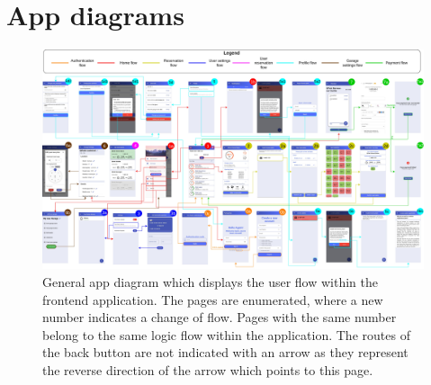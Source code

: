 \section{App diagrams}\label{app:app-diagram}
\begin{landscape}
   \begin{figure}
    \centering
    \includegraphics[width=25cm]{images/app/app_diagrams/app_diagram-general.jpg}
    \caption[General app diagram.]{General app diagram which displays the user flow within the frontend application. The pages are enumerated, where a new number indicates a change of flow. Pages with the same number belong to the same logic flow within the application. The routes of the back button are not indicated with an arrow as they represent the reverse direction of the arrow which points to this page.}
    \label{fig:general-app-diagram}
\end{figure}
\end{landscape}

